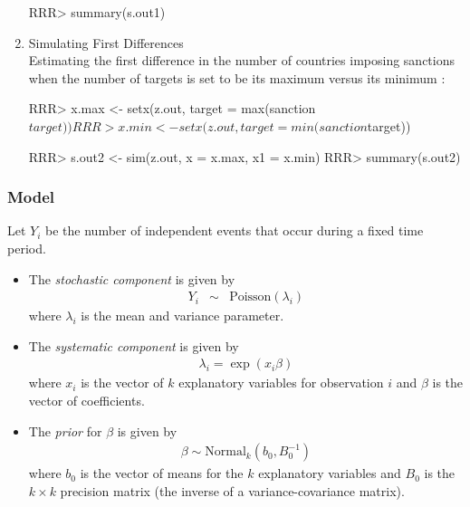\begin{enumerate}
\begin{Schunk}
\begin{Sinput}
RRR> summary(s.out1)
\end{Sinput}
\end{Schunk}
\item {Simulating First Differences} \\
Estimating the first difference in the number of countries imposing sanctions
when the number of targets is set to be its maximum versus its minimum :
\begin{Schunk}
\begin{Sinput}
RRR>  x.max <- setx(z.out, target = max(sanction$target))
RRR>  x.min <- setx(z.out, target = min(sanction$target))
\end{Sinput}
\end{Schunk}
\begin{Schunk}
\begin{Sinput}
RRR>  s.out2 <- sim(z.out, x = x.max, x1 = x.min)
RRR>  summary(s.out2)
\end{Sinput}
\end{Schunk}
\end{enumerate}

\subsubsection{Model}

Let $Y_{i}$ be the number of independent events that occur during 
a fixed time period. 
\begin{itemize}
\item The \emph{stochastic component} is given by
\begin{eqnarray*}
Y_{i}  &  \sim & \textrm{Poisson}(\lambda_i)
\end{eqnarray*}
where $\lambda_i$ is the mean and variance parameter.

\item The \emph{systematic component} is given by
\begin{eqnarray*}
\lambda_{i}= \exp(x_{i} \beta)
\end{eqnarray*}
where $x_{i}$ is the vector of $k$ explanatory variables for observation $i$
and $\beta$ is the vector of coefficients.

\item The \emph{prior} for $\beta$ is given by
\begin{eqnarray*}
\beta \sim \textrm{Normal}_k \left(  b_{0},B_{0}^{-1}\right)
\end{eqnarray*}
where $b_{0}$ is the vector of means for the $k$ explanatory variables
and $B_{0}$ is the $k \times k$ precision matrix (the inverse of a
variance-covariance matrix).
\end{itemize}

